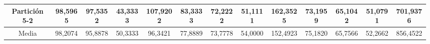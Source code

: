 \documentclass[12pt]{article}
\begin{document}
\begin{table}[H]
{\begin{tabular}{|c|cccc|cccc|cccc|}
Partición 5-2 & \multicolumn{1}{c|}{98,5965}                                                  & \multicolumn{1}{c|}{97,5352}                                                 & \multicolumn{1}{c|}{43,3333} & 107,9202 & \multicolumn{1}{c|}{83,3333}                                                  & \multicolumn{1}{c|}{72,2222}                                                 & \multicolumn{1}{c|}{51,1111} & 162,3525 & \multicolumn{1}{c|}{73,1959}                                                  & \multicolumn{1}{c|}{65,1042}                                                 & \multicolumn{1}{c|}{51,0791} & 701,9376  \\ \hline
Media         & \multicolumn{1}{c|}{98,2074}                                                  & \multicolumn{1}{c|}{95,8878}                                                 & \multicolumn{1}{c|}{50,3333} & 96,3421  & \multicolumn{1}{c|}{77,8889}                                                  & \multicolumn{1}{c|}{73,7778}                                                 & \multicolumn{1}{c|}{54,0000} & 152,4923 & \multicolumn{1}{c|}{75,1820}                                                  & \multicolumn{1}{c|}{65,7566}                                                 & \multicolumn{1}{c|}{52,2662} & 856,4522  \\ \hline
\end{tabular}}
\end{table}
\end{document}
